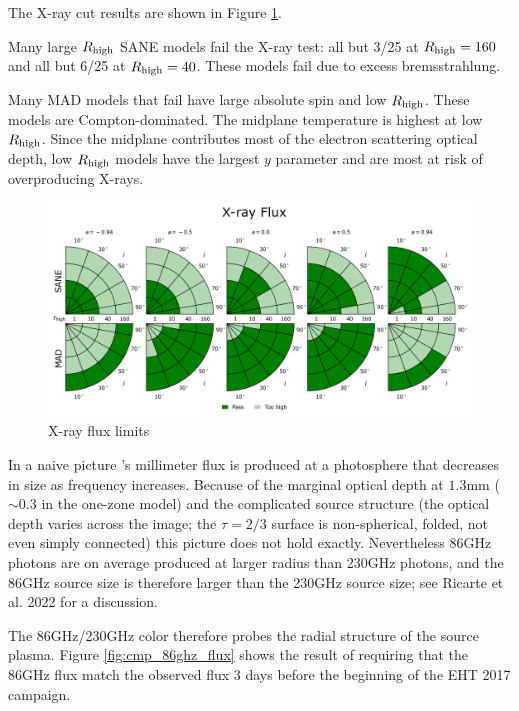 The X-ray cut results are shown in Figure \ref{fig:cmp_xray_flux}.

Many large $R_\mathrm{high}$ SANE models fail the X-ray test: all but 3/25 at $R_\mathrm{high} = 160$ and all but 6/25 at $R_\mathrm{high} = 40$.  These models fail due to excess bremsstrahlung.

Many MAD models that fail have large absolute spin and low $R_\mathrm{high}$.  These models are Compton-dominated.  The midplane temperature is highest at low $R_\mathrm{high}$.  Since the midplane contributes most of the electron scattering optical depth, low $R_\mathrm{high}$ models have the largest $y$ parameter and are most at risk of overproducing X-rays.

\begin{figure}
  \centering
  \includegraphics[width=\columnwidth]{./figures/Xray_flux_Constraints.png}
  \caption{X-ray flux limits}
  \label{fig:cmp_xray_flux}
\end{figure}


In a naive picture \sgra's millimeter flux is produced at a photosphere that decreases in size as frequency increases.  Because of the marginal optical depth at $1.3$mm ($\sim 0.3$ in the one-zone model) and the complicated source structure (the optical depth varies across the image; the $\tau = 2/3$ surface is non-spherical, folded, not even simply connected) this picture does not hold exactly.  Nevertheless 86GHz photons are on average produced at larger radius than 230GHz photons, and the 86GHz source size is therefore larger than the 230GHz source size; see Ricarte et al. 2022 for a discussion.

The 86GHz/230GHz color therefore probes the radial structure of the source plasma.  Figure \ref{fig:cmp_86ghz_flux} shows the result of requiring that the 86GHz flux match the observed flux 3 days before the beginning of the EHT 2017 campaign.

